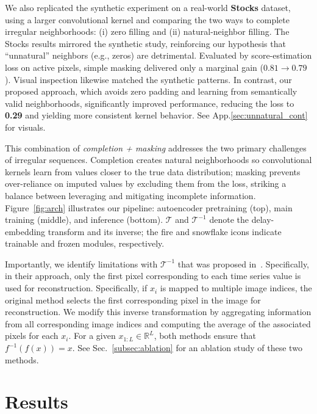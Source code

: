 \documentclass{article}
\theoremstyle{plain}
\theoremstyle{definition}
\theoremstyle{remark}
\begin{document}
We also replicated the synthetic experiment on a real-world \textbf{Stocks} dataset, using a larger convolutional kernel and comparing the two ways to complete irregular neighborhoods: (i) zero filling and (ii) natural-neighbor filling. The Stocks results mirrored the synthetic study, reinforcing our hypothesis that ``unnatural'' neighbors (e.g., zeros) are detrimental. Evaluated by score-estimation loss on active pixels, simple masking delivered only a marginal gain ($0.81 \to 0.79$). Visual inspection likewise matched the synthetic patterns. In contrast, our proposed approach, which avoids zero padding and learning from semantically valid neighborhoods, significantly improved performance, reducing the loss to \textbf{0.29} and yielding more consistent kernel behavior. See App.\ref{sec:unnatural_cont} for visuals.

This combination of \emph{completion + masking} addresses the two primary challenges of irregular sequences. Completion creates natural neighborhoods so convolutional kernels learn from values closer to the true data distribution; masking prevents over-reliance on imputed values by excluding them from the loss, striking a balance between leveraging and mitigating incomplete information. Figure~\ref{fig:arch} illustrates our pipeline: autoencoder pretraining (top), main training (middle), and inference (bottom). $\mathcal{T}$ and $\mathcal{T}^{-1}$ denote the delay-embedding transform and its inverse; the fire and snowflake icons indicate trainable and frozen modules, respectively.


Importantly, we identify limitations with $\mathcal{T}^{-1}$ that was proposed in~\cite{naiman2024utilizing}. Specifically, in their approach, only the first pixel corresponding to each time series value is used for reconstruction. Specifically, if $x_i$ is mapped to multiple image indices, the original method selects the first corresponding pixel in the image for reconstruction. We modify this inverse transformation by aggregating information from all corresponding image indices and computing the average of the associated pixels for each \( x_i \). For a given \( x_{1:L} \in \mathbb{R}^L \), both methods ensure that \( f^{-1}(f(x)) = x \). See Sec.~\ref{subsec:ablation} for an ablation study of these two methods.



\vspace{-3mm}
\section{Results}
\label{sec:results}
\vspace{-2mm}
\end{document}
